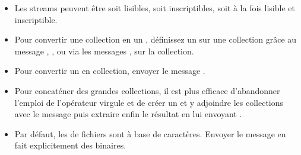 \documentclass[a4paper,10pt,twoside]{book}
\begin{document}
\begin{itemize}
  \item Les streams peuvent \^etre soit lisibles, soit inscriptibles, soit \`a la fois lisible et inscriptible.
  \item Pour convertir une collection en un \stream, d\'efinissez un \stream
sur une collection gr\^ace au message , \eg {}, ou via les messages , \etc sur la collection.
  \item Pour convertir un \stream en collection, envoyer le message .
  \item Pour concat\'ener des grandes collections, il est plus efficace d'abandonner l'emploi de l'op\'erateur virgule \ct{,} et de cr\'eer un \stream et y adjoindre les collections avec le message  puis extraire enfin le r\'esultat en lui envoyant .
  \item Par d\'efaut, les \streams de fichiers sont \`a base de caract\`eres.
Envoyer le message  en fait explicitement des \streams binaires.
\end{itemize}

\ifx\wholebook\relax\else
\end{document}
